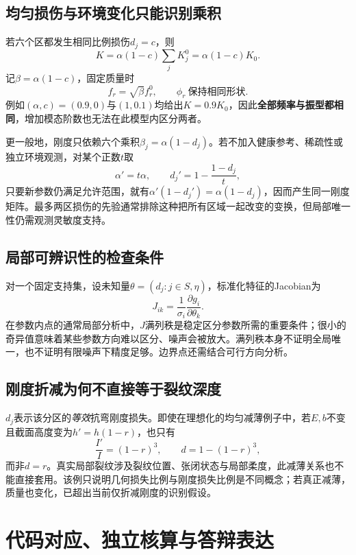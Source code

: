 \documentclass[UTF8,a4paper,11pt,fontset=fandol]{ctexart}
\numberwithin{equation}{section}
\begin{document}
\subsection{均匀损伤与环境变化只能识别乘积}
若六个区都发生相同比例损伤$d_j=c$，则
\begin{equation}
K=\alpha(1-c)\sum_jK_j^0=\alpha(1-c)K_0.
\end{equation}
记$\beta=\alpha(1-c)$，固定质量时
\begin{equation}
f_r=\sqrt\beta f_r^0,\qquad \phi_r\ \text{保持相同形状}.
\end{equation}
例如$(\alpha,c)=(0.9,0)$与$(1,0.1)$均给出$K=0.9K_0$，因此\textbf{全部频率与振型都相同}，增加模态阶数也无法在此模型内区分两者。

更一般地，刚度只依赖六个乘积$\beta_j=\alpha(1-d_j)$。若不加入健康参考、稀疏性或独立环境观测，对某个正数$t$取
\begin{equation}
\alpha'=t\alpha,\qquad d_j'=1-\frac{1-d_j}{t},
\end{equation}
只要新参数仍满足允许范围，就有$\alpha'(1-d_j')=\alpha(1-d_j)$，因而产生同一刚度矩阵。最多两区损伤的先验通常排除这种把所有区域一起改变的变换，但局部唯一性仍需观测灵敏度支持。
\subsection{局部可辨识性的检查条件}
对一个固定支持集，设未知量$\theta=(d_j:j\in S,\eta)$，标准化特征的Jacobian为
\begin{equation}
J_{ik}=\frac1{\sigma_i}\frac{\partial g_i}{\partial\theta_k}.
\end{equation}
在参数内点的通常局部分析中，$J$满列秩是稳定区分参数所需的重要条件；很小的奇异值意味着某些参数方向难以区分、噪声会被放大。满列秩本身不证明全局唯一，也不证明有限噪声下精度足够。边界点还需结合可行方向分析。
\subsection{刚度折减为何不直接等于裂纹深度}
$d_j$表示该分区的\emph{等效}抗弯刚度损失。即使在理想化的均匀减薄例子中，若$E,b$不变且截面高度变为$h'=h(1-r)$，也只有
\begin{equation}
\frac{I'}{I}=(1-r)^3,\qquad d=1-(1-r)^3,
\end{equation}
而非$d=r$。真实局部裂纹涉及裂纹位置、张闭状态与局部柔度，此减薄关系也不能直接套用。该例只说明几何损失比例与刚度损失比例是不同概念；若真正减薄，质量也变化，已超出当前仅折减刚度的识别假设。

\newpage
\section{代码对应、独立核算与答辩表达}
\end{document}
